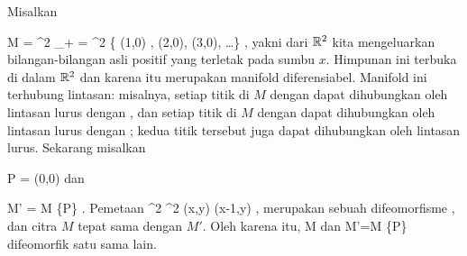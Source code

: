 Misalkan

\mavergleichskettedisp
{\vergleichskette
{M
}
{ =} { \R^2 \setminus \N_+
}
{ =} { \R^2 \setminus \{ (1,0) , (2,0), (3,0), \ldots  \}
}
{ } {
}
{ } {
}
}
{}{}{,}
yakni dari ${\mathbb R}^2$ kita mengeluarkan bilangan-bilangan asli positif yang terletak pada sumbu $x$. Himpunan ini terbuka di dalam ${\mathbb R}^2$ dan karena itu merupakan manifold diferensiabel. Manifold ini terhubung lintasan: misalnya, setiap titik di $M$ dengan
 dapat dihubungkan oleh lintasan lurus dengan
, dan setiap titik di $M$ dengan
 dapat dihubungkan oleh lintasan lurus dengan
; kedua titik tersebut juga dapat dihubungkan oleh lintasan lurus. Sekarang misalkan

\mavergleichskettedisp
{\vergleichskette
{P
}
{ =} { (0,0)
}
{ } {
}
{ } {
}
{ } {
}
}
{}{}{}
dan

\mavergleichskettedisp
{\vergleichskette
{M'
}
{ =} { M \setminus \{P\}
}
{ } {
}
{ } {
}
{ } {
}
}
{}{}{.}
Pemetaan
\maabbeledisp {} {\R^2} {\R^2
} {(x,y)} {(x-1,y)
} {,}
merupakan sebuah difeomorfisme
 {} {},
dan citra $M$ tepat sama dengan $M'$. Oleh karena itu,
\mathkor {} {M} {dan} {M'=M \setminus \{P\}} {}
difeomorfik satu sama lain.
